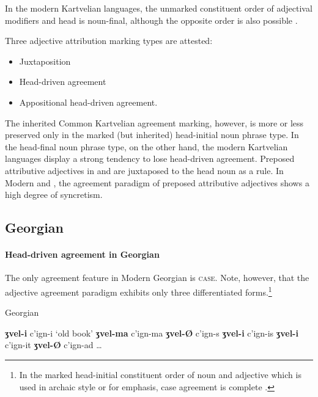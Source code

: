 In the modern Kartvelian languages, the unmarked constituent order of adjectival modifiers and head is noun-final, although the opposite order is also possible \citep[56]{harris1991a}.

Three adjective attribution marking types are attested:
\begin{itemize}
\item Juxtaposition
\item Head\hyp{}driven agreement
\item Appositional head\hyp{}driven agreement.
\end{itemize}
The inherited Common Kartvelian agreement marking, however, is more or less preserved only in the marked (but inherited) head-initial noun phrase type. In the head-final noun phrase type, on the other hand, the modern Kartvelian languages display a strong tendency to lose head\hyp{}driven agreement. Preposed attributive adjectives in  and  are juxtaposed to the head noun as a rule. In Modern  and , the agreement paradigm of preposed attributive adjectives shows a high degree of syncretism.

\subsection{Georgian}\label{georgian synchr}
\paragraph*{Head\hyp{}driven agreement in Georgian}
The only agreement feature in Modern Georgian is \textsc{case}. Note, however, that the adjective agreement paradigm exhibits only three differentiated forms.\footnote{In the marked head-initial constituent order of noun and adjective which is used in archaic style or for emphasis, case agreement is complete \citep[59]{tuite1998}.}
\begin{exe}
\settowidth{}
\label{georgian old}
\ex \rm{Georgian \citep[236]{aronson1991}}
\begin{xlist}
\ex \textbf{ʒvel-i} c'ign-i		\rm{‘old book’}	
\ex \textbf{ʒvel-ma} c'ign-ma				
\ex \textbf{ʒvel-Ø} c'ign-s					
\ex \textbf{ʒvel-i} c'ign-is					
\ex \textbf{ʒvel-i} c'ign-it					
\ex \textbf{ʒvel-Ø} c'ign-ad					
\ex \dots
\end{xlist}
\end{exe}

